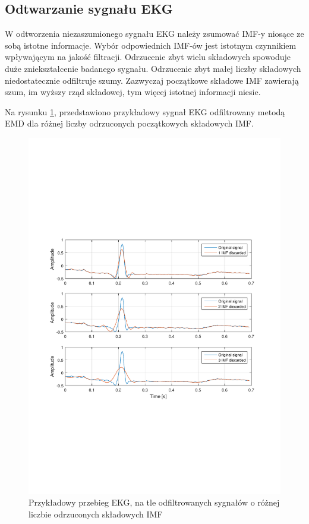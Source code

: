 \newpage

\subsection{Odtwarzanie sygnału EKG}
\indent

W odtworzenia niezaszumionego sygnału EKG należy zsumować IMF-y niosące ze sobą
istotne informacje. Wybór odpowiednich IMF-ów jest istotnym czynnikiem
wpływającym na jakość filtracji. Odrzucenie zbyt wielu składowych spowoduje duże
zniekształcenie badanego sygnału. Odrzucenie zbyt małej liczby składowych
niedostatecznie odfiltruje szumy. Zazwyczaj początkowe składowe IMF zawierają
szum, im wyższy rząd składowej, tym więcej istotnej informacji niesie.

Na rysunku \ref{rys:example_ekg}, przedstawiono przykładowy sygnał EKG
odfiltrowany metodą EMD dla różnej liczby odrzuconych początkowych składowych
IMF.

\begin{figure}[!htb]
    \begin{center}
        \includegraphics[width=14cm,trim=1.5cm 7.8cm 1.5cm 7.8cm,clip]
        {../img/ka_example.pdf}
    \end{center}
    \caption{Przykładowy przebieg EKG, na tle odfiltrowanych sygnałów o różnej
    liczbie odrzuconych składowych IMF}
    \label{rys:example_ekg}
\end{figure}


